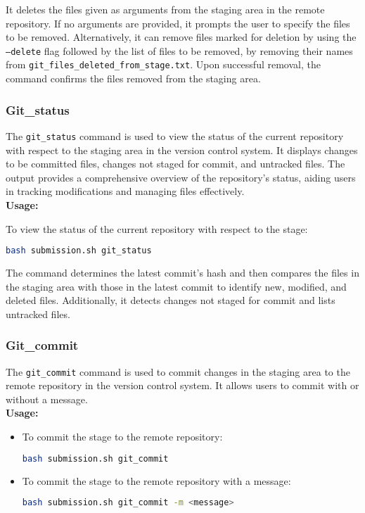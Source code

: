 \documentclass{article}
\begin{document}
It deletes the files given as arguments from the staging area in the remote repository. If no arguments are provided, it prompts the user to specify the files to be removed. Alternatively, it can remove files marked for deletion by using the \texttt{--delete} flag followed by the list of files to be removed, by removing their names from \texttt{git\_files\_deleted\_from\_stage.txt}. Upon successful removal, the command confirms the files removed from the staging area.

\subsubsection{Git\_status}
The \texttt{git\_status} command is used to view the status of the current repository with respect to the staging area in the version control system. It displays changes to be committed files, changes not staged for commit, and untracked files. The output provides a comprehensive overview of the repository's status, aiding users in tracking modifications and managing files effectively.\\
\textbf{Usage:}
\begin{adjustwidth}{0.5cm}{0cm}
To view the status of the current repository with respect to the stage:
\begin{lstlisting}[language=bash]
bash submission.sh git_status
\end{lstlisting}
\end{adjustwidth}

The command determines the latest commit's hash and then compares the files in the staging area with those in the latest commit to identify new, modified, and deleted files. Additionally, it detects changes not staged for commit and lists untracked files. 

\subsubsection{Git\_commit}
The \texttt{git\_commit} command is used to commit changes in the staging area to the remote repository in the version control system. It allows users to commit with or without a message.\\
\textbf{Usage:}
\begin{itemize}
\item To commit the stage to the remote repository:
\begin{lstlisting}[language=bash]
bash submission.sh git_commit
\end{lstlisting}
\item To commit the stage to the remote repository with a message:
\begin{lstlisting}[language=bash]
bash submission.sh git_commit -m <message>
\end{lstlisting}
\end{itemize}
\end{document}
